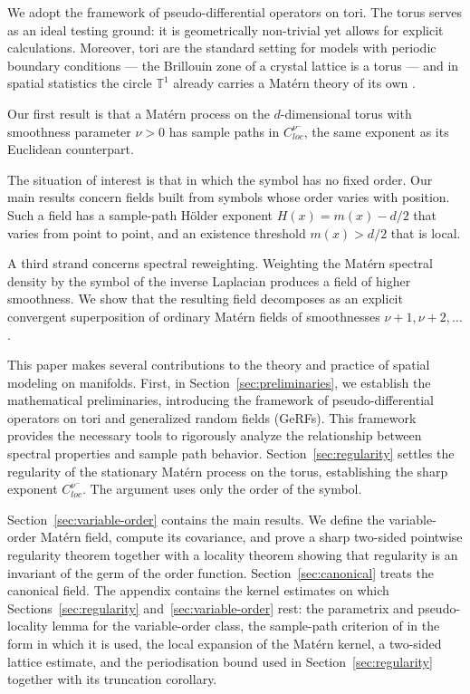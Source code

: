 \documentclass[pdflatex,sn-mathphys,Numbered]{sn-jnl}
\theoremstyle{thmstyleone}%
\theoremstyle{thmstyletwo}%
\theoremstyle{thmstylethree}%
\newcommand{\TT}{\mathbb{T}}
\begin{document}
We adopt the framework of pseudo-differential operators on tori. The torus
serves as an ideal testing ground: it is geometrically non-trivial yet allows
for explicit calculations. Moreover, tori are the standard setting for models
with periodic boundary conditions --- the Brillouin zone of a crystal lattice is
a torus \cite{ashcroft} --- and in spatial statistics the circle $\TT^1$ already
carries a Mat\'ern theory of its own \cite{huang}.

Our first result is that a Mat\'ern process on the $d$-dimensional torus with
smoothness parameter $\nu > 0$ has sample paths in $C^{\nu^-}_{loc}$, the same
exponent as its Euclidean counterpart.

The situation of interest is that in which the symbol has no fixed order. Our
main results concern fields built from symbols whose order varies with
position. Such a field has a sample-path H\"older exponent $H(x) = m(x) - d/2$
that varies from point to point, and an existence threshold $m(x) > d/2$ that is
local.

A third strand concerns spectral reweighting. Weighting the Mat\'ern spectral
density by the symbol of the inverse Laplacian produces a field of higher
smoothness. We show that the resulting field decomposes as an explicit
convergent superposition of ordinary Mat\'ern fields of smoothnesses
$\nu+1, \nu+2, \dots$.

This paper makes several contributions to the theory and practice of spatial
modeling on manifolds. First, in Section~\ref{sec:preliminaries}, we establish
the mathematical preliminaries, introducing the framework of pseudo-differential
operators on tori and generalized random fields (GeRFs). This framework provides
the necessary tools to rigorously analyze the relationship between spectral
properties and sample path behavior. Section~\ref{sec:regularity} settles the
regularity of the stationary Mat\'ern process on the torus, establishing the
sharp exponent $C^{\nu^-}_{loc}$. The argument uses only the order of the symbol.

Section~\ref{sec:variable-order} contains the main results. We define the
variable-order Mat\'ern field, compute its covariance, and prove
a sharp two-sided pointwise regularity theorem together with a locality theorem
showing that regularity is an invariant of the germ of the order function.
Section~\ref{sec:canonical} treats the canonical field. The appendix contains
the kernel estimates on which Sections~\ref{sec:regularity}
and~\ref{sec:variable-order} rest: the parametrix and pseudo-locality lemma for
the variable-order class, the sample-path criterion of \cite{path-reg} in the
form in which it is used, the local expansion of the Mat\'ern kernel, a
two-sided lattice estimate, and the periodisation bound used in
Section~\ref{sec:regularity} together with its truncation corollary.
\end{document}

